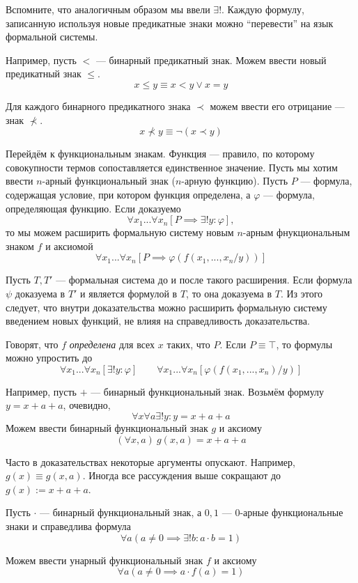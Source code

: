 Вспомните, что аналогичным образом мы ввели $\exists!$. Каждую формулу,
записанную используя новые предикатные знаки можно
``перевести'' на язык формальной системы.

Например, пусть $<$ --- бинарный предикатный знак.
Можем ввести новый предикатный знак $\leq$.
\[
	x\leq y\equiv x<y\lor x=y
\]

Для каждого бинарного предикатного знака $\prec$ можем
ввести его отрицание --- знак $\nprec$.
\[
	x\nprec y\equiv \lnot(x\prec y)
\]

Перейдём к функциональным знакам. Функция --- правило, по которому совокупности
термов сопоставляется единственное значение. Пусть мы хотим ввести $n$-арный
функциональный знак ($n$-арную функцию). Пусть $P$ --- формула, содержащая
условие, при котором функция определена, а $\varphi$ --- формула, определяющая
функцию. Если доказуемо
\[
	\forall x_1...\forall x_n[P\implies \exists! y:\varphi],
\]
то мы можем расширить формальную систему новым $n$-арным фнукциональным знаком $f$
и аксиомой
\[
	\forall x_1...\forall x_{n}[P\implies \varphi(f(x_1,...,x_{n}/y))]
\]

Пусть $T,T'$ --- формальная система до и после такого расширения.
Если формула $\psi$ доказуема в $T'$ и является формулой в $T$, то она доказуема в $T$.
Из этого следует, что внутри доказательства можно расширить формальную систему
введением новых функций, не влияя на справедливость доказательства.

Говорят, что $f$ {\it определена} для всех $x$ таких, что $P$.
Если $P\equiv \top$, то формулы можно упростить до
\[
	\forall x_1...\forall x_{n}[\exists !y:\varphi]\qquad
	\forall x_1...\forall x_{n}[\varphi(f(x_1,...,x_{n})/y)]
\]

Например, пусть $+$ --- бинарный функциональный знак. Возьмём формулу $y=x+a+a$, очевидно,
\[
	\forall x\forall a\exists !y:y=x+a+a
\]
Можем ввести бинарный функциональный знак $g$ и аксиому
\[
	(\forall x,a)~g(x,a)=x+a+a
\]

Часто в доказательствах некоторые аргументы опускают.
Например, $g(x)\equiv g(x,a)$.
Иногда все рассуждения выше сокращают до $g(x):=x+a+a$.

Пусть $\cdot$ --- бинарный функциональный знак,
а $0,1$ --- $0$-арные функциональные знаки и справедлива формула
\[
	\forall a(a\neq 0\implies \exists !b:a\cdot b=1)
\]

Можем ввести унарный функциональный знак $f$ и аксиому
\[
	\forall a(a\neq 0\implies a\cdot f(a)=1)
\]

\pagebreak
